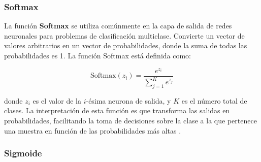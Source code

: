 \subsubsection*{Softmax}


La función \textbf{Softmax} se utiliza comúnmente en la capa de salida de redes neuronales para problemas de clasificación multiclase. Convierte un vector de valores arbitrarios en un vector de probabilidades, donde la suma de todas las probabilidades es 1. La función Softmax está definida como:

\begin{equation}
    \text{Softmax}(z_i) = \frac{e^{z_i}}{\sum_{j=1}^{K} e^{z_j}}
\end{equation}

donde \(z_i\) es el valor de la \(i\)-ésima neurona de salida, y \(K\) es el número total de clases. La interpretación de esta función es que transforma las salidas en probabilidades, facilitando la toma de decisiones sobre la clase a la que pertenece una muestra en función de las probabilidades más altas \citep{pajares2021aprendizaje}. 




\subsubsection*{Sigmoide}


